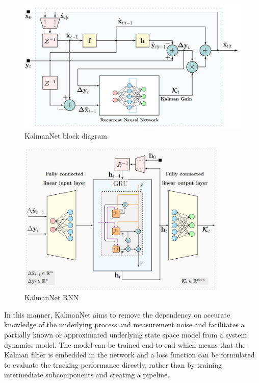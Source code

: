 \documentclass[a4paper,twoside,12pt]{report}
\begin{document}
\begin{figure}[h!]
\begin{center}
\includegraphics[width=12.5cm]{images/kalmannet1.jpg}
\caption{KalmanNet block diagram \citep{kalmannet}}
\label{fig:blockd}
\end{center}
\end{figure}

\begin{figure}[h!]
\begin{center}
\includegraphics[width=10cm]{images/kalmannet2.jpg}
\caption{KalmanNet RNN \citep{kalmannet}}
\label{fig:architecture}
\end{center}
\end{figure}

In this manner, KalmanNet aims to remove the dependency on accurate knowledge of the underlying process and measurement noise and facilitates a partially known or approximated underlying state space model from a system dynamics model. The model can be trained end-to-end which means that the Kalman filter is embedded in the network and a loss function can be formulated to evaluate the tracking performance directly, rather than by training intermediate subcomponents and creating a pipeline.
\end{document}
